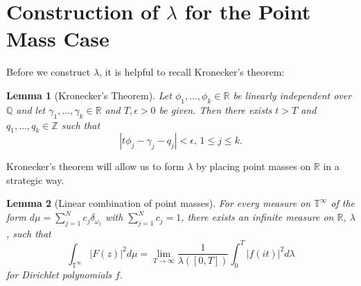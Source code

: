 \documentclass[]{elsarticle}
\newcommand{\R}{\mathbb{R}}
\newcommand{\Q}{\mathbb{Q}}
\newcommand{\T}{\mathbb{T}}
\newcommand{\Z}{\mathbb{Z}}
\numberwithin{equation}{section}
\newtheorem{lemma}{Lemma}
\begin{document}
\section{Construction of $\lambda$ for the Point Mass Case}  
    Before we construct $\lambda$, it is helpful to recall Kronecker's theorem:
    \begin{lemma}[Kronecker's Theorem]
      Let \( \phi_1, \dotsc , \phi_k \in \R\) be linearly independent over \(\Q\) and let \(\gamma_1, \dotsc , \gamma_k \in \R\) and \(T,\epsilon >0\) be given. Then there exists \(t>T\) and \(q_1, \dotsc , q_k \in \Z\) such that \[|t \phi_j - \gamma_j -q_j|<\epsilon, \, 1\leq j \leq k.\]
    \end{lemma}
    Kronecker's theorem will allow us to form $\lambda$ by placing point masses on $\R$ in a strategic way.
    \begin{lemma}[Linear combination of point masses]\label{lincombo}
      For every measure on $\T^{\infty}$ of the form $d\mu = \sum_{j=1}^N c_j \delta_{\omega_j}$ with $\sum_{j=1}^N c_j = 1$, there exists an infinite measure on $\R$, $\lambda$, such that
      \begin{equation}\label{nugood}
        \int_{\T^{\infty}}|F(z)|^2d\mu = \lim_{T \to \infty} \frac{1}{\lambda([0,T])} \int_{0}^{T} |f(it)|^2 d\lambda
      \end{equation}
      for Dirichlet polynomials $f$.
    \end{lemma}
\end{document}
